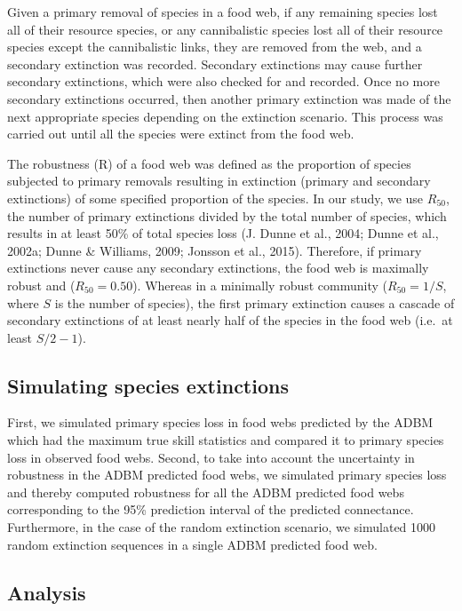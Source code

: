 \documentclass{article}
\begin{document}
Given a primary removal of species in a food web, if any remaining
species lost all of their resource species, or any cannibalistic species
lost all of their resource species except the cannibalistic links, they
are removed from the web, and a secondary extinction was recorded.
Secondary extinctions may cause further secondary extinctions, which
were also checked for and recorded. Once no more secondary extinctions
occurred, then another primary extinction was made of the next
appropriate species depending on the extinction scenario. This process
was carried out until all the species were extinct from the food web.

The robustness (R) of a food web was defined as the proportion of
species subjected to primary removals resulting in extinction (primary
and secondary extinctions) of some specified proportion of the species.
In our study, we use \(R_{50}\), the number of primary extinctions
divided by the total number of species, which results in at least 50\%
of total species loss (J. Dunne et al., 2004; Dunne et al., 2002a; Dunne
\& Williams, 2009; Jonsson et al., 2015). Therefore, if primary
extinctions never cause any secondary extinctions, the food web is
maximally robust and (\(R_{50} = 0.50\)). Whereas in a minimally robust
community (\(R_{50} = 1/S\), where \(S\) is the number of species), the
first primary extinction causes a cascade of secondary extinctions of at
least nearly half of the species in the food web (i.e.~at least
\(S/2 - 1\)).

\hypertarget{simulating-species-extinctions}{%
\subsection{Simulating species
extinctions}\label{simulating-species-extinctions}}

First, we simulated primary species loss in food webs predicted by the
ADBM which had the maximum true skill statistics and compared it to
primary species loss in observed food webs. Second, to take into account
the uncertainty in robustness in the ADBM predicted food webs, we
simulated primary species loss and thereby computed robustness for all
the ADBM predicted food webs corresponding to the 95\% prediction
interval of the predicted connectance. Furthermore, in the case of the
random extinction scenario, we simulated 1000 random extinction
sequences in a single ADBM predicted food web.

\hypertarget{analysis}{%
\subsection{Analysis}\label{analysis}}
\end{document}
